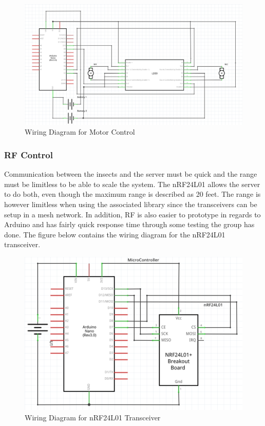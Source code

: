 \documentclass[11pt]{article}
\begin{document}
\begin{figure}[H]
   \centering
   \includegraphics[width=\textwidth]{img/MotorWiringDiagram.png}
   \caption{Wiring Diagram for Motor Control}
\end{figure}

\subsubsection{RF Control}
Communication between the insects and the server must be quick and the range must be limitless to be able to scale the system. The nRF24L01 allows the server to do both, even though the maximum range is described as 20 feet. The range is however limitless when using the associated library since the transceivers can be setup in a mesh network. In addition, RF is also easier to prototype in regards to Arduino and has fairly quick response time through some testing the group has done. The figure below contains the wiring diagram for the nRF24L01 transceiver.  
\begin{figure}[H]
   \centering
   \includegraphics[width=\textwidth]{img/nRFWiringDiagram.png}
   \caption{Wiring Diagram for nRF24L01 Transceiver}
\end{figure}
\end{document}
